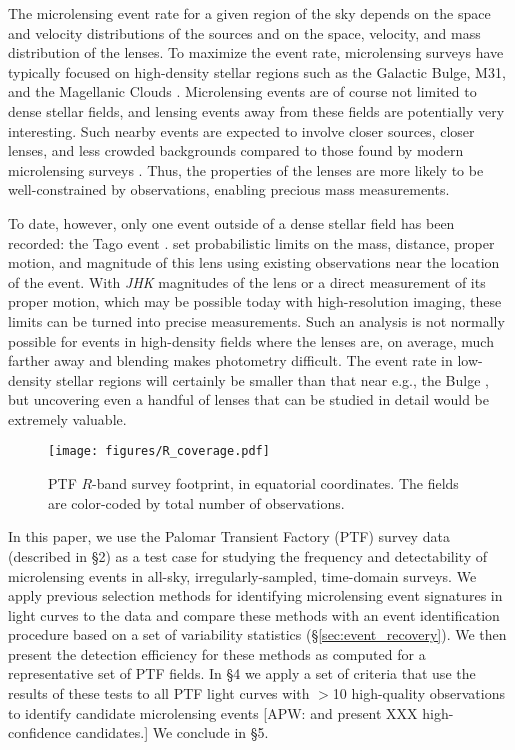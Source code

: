 \documentclass{emulateapj}
\begin{document}
The microlensing event rate for a given region of the sky depends on the space and velocity distributions of the sources and on the space, velocity, and mass distribution of the lenses. To maximize the event rate, microlensing surveys have typically focused on high-density stellar regions such as the Galactic Bulge, M31, and the Magellanic Clouds \citep[e.g.][]{original_ogle, original_macho, eros_original, crotts1996}. Microlensing events are of course not limited to dense stellar fields, and lensing events away from these fields are potentially very interesting. Such nearby events are expected to involve closer sources, closer lenses, and less crowded backgrounds compared to those found by modern microlensing surveys \citep{mesolensing}. Thus, the properties of the lenses are more likely to be well-constrained by observations, enabling precious mass measurements.

To date, however, only one event outside of a dense stellar field has been recorded: the Tago event \citep{fukui2007, gaudi2008}. \cite{gaudi2008} set probabilistic limits on the mass, distance, proper motion, and magnitude of this lens using existing observations near the location of the event. With \textit{JHK} magnitudes of the lens or a direct measurement of its proper motion, which may be possible today with high-resolution imaging, these limits can be turned into precise measurements. Such an analysis is not normally possible for events in high-density fields where the lenses are, on average, much farther away and blending makes photometry difficult. The event rate in low-density stellar regions will certainly be smaller than that near e.g., the Bulge \citep[][]{wood_optical_depth, ogle_optical_depth, macho_optical_depth, eros_optical_depth}, but uncovering even a handful of lenses that can be studied in detail would be extremely valuable.

\begin{figure*}[!ht]
\centering\texttt{[image: figures/R\_coverage.pdf]}
\caption{PTF $R$-band survey footprint, in equatorial coordinates. The fields are color-coded by total number of observations.}\label{fig:survey_footprint}
\end{figure*}	

In this paper, we use the Palomar Transient Factory (PTF) survey data (described in \S2) as a test case for studying the frequency and detectability of microlensing events in all-sky, irregularly-sampled, time-domain surveys. We apply previous selection methods for identifying microlensing event signatures in light curves to the data and compare these methods with an event identification procedure based on a set of variability statistics (\S\ref{sec:event_recovery}). We then present the detection efficiency for these methods as computed for a representative set of PTF fields. In \S4 we apply a set of criteria that use the results of these tests to all PTF light curves with $>$10 high-quality observations to identify candidate microlensing events [APW: and present XXX high-confidence candidates.] We conclude in \S5.
\end{document}
